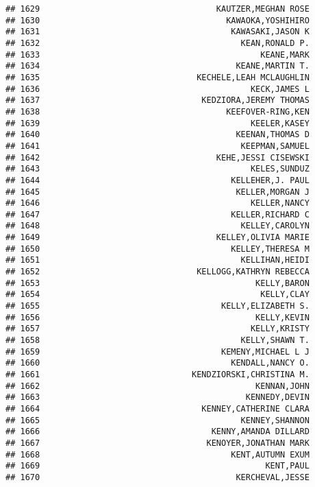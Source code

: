 \documentclass[
]{article}
\begin{document}
\begin{verbatim}
## 1629                                    KAUTZER,MEGHAN ROSE
## 1630                                      KAWAOKA,YOSHIHIRO
## 1631                                       KAWASAKI,JASON K
## 1632                                         KEAN,RONALD P.
## 1633                                             KEANE,MARK
## 1634                                        KEANE,MARTIN T.
## 1635                                KECHELE,LEAH MCLAUGHLIN
## 1636                                           KECK,JAMES L
## 1637                                 KEDZIORA,JEREMY THOMAS
## 1638                                      KEEFOVER-RING,KEN
## 1639                                           KEELER,KASEY
## 1640                                        KEENAN,THOMAS D
## 1641                                         KEEPMAN,SAMUEL
## 1642                                    KEHE,JESSI CISEWSKI
## 1643                                           KELES,SUNDUZ
## 1644                                       KELLEHER,J. PAUL
## 1645                                        KELLER,MORGAN J
## 1646                                           KELLER,NANCY
## 1647                                       KELLER,RICHARD C
## 1648                                         KELLEY,CAROLYN
## 1649                                    KELLEY,OLIVIA MARIE
## 1650                                       KELLEY,THERESA M
## 1651                                         KELLIHAN,HEIDI
## 1652                                KELLOGG,KATHRYN REBECCA
## 1653                                            KELLY,BARON
## 1654                                             KELLY,CLAY
## 1655                                     KELLY,ELIZABETH S.
## 1656                                            KELLY,KEVIN
## 1657                                           KELLY,KRISTY
## 1658                                         KELLY,SHAWN T.
## 1659                                     KEMENY,MICHAEL L J
## 1660                                       KENDALL,NANCY O.
## 1661                               KENDZIORSKI,CHRISTINA M.
## 1662                                            KENNAN,JOHN
## 1663                                          KENNEDY,DEVIN
## 1664                                 KENNEY,CATHERINE CLARA
## 1665                                         KENNEY,SHANNON
## 1666                                   KENNY,AMANDA DILLARD
## 1667                                  KENOYER,JONATHAN MARK
## 1668                                       KENT,AUTUMN EXUM
## 1669                                              KENT,PAUL
## 1670                                        KERCHEVAL,JESSE

\end{verbatim}
\end{document}
